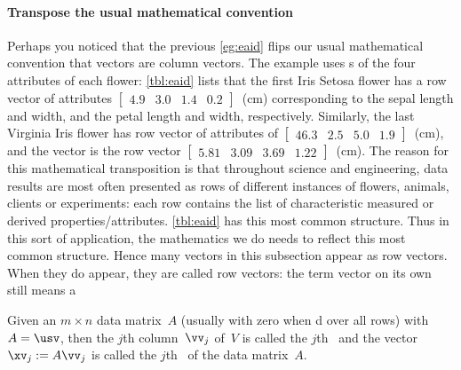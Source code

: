\paragraph{Transpose the usual mathematical convention}
Perhaps you noticed that the previous \cref{eg:eaid} flips our usual mathematical convention that vectors are column vectors.
The example uses s of the four attributes of each flower: 
\cref{tbl:eaid} lists that the first Iris Setosa flower has a row vector of attributes \(\begin{bmatrix} 4.9&3.0&1.4&0.2 \end{bmatrix}\)~(cm) corresponding to the sepal length and width, and the petal length and width, respectively.
Similarly, the last Virginia Iris flower has row vector of attributes of \(\begin{bmatrix} 46.3&2.5&5.0&1.9 \end{bmatrix}\)~(cm), and the  vector is the row vector \(\begin{bmatrix} 5.81&3.09&3.69&1.22 \end{bmatrix}\)~(cm).
The reason for this mathematical transposition is that throughout science and engineering, data results are most often presented as rows of different instances of flowers, animals, clients or experiments: each row contains the list of characteristic measured or derived properties\slash attributes.
\cref{tbl:eaid} has this most common structure.
Thus in this sort of application, the mathematics we do needs to reflect this most common structure.
Hence many vectors in this subsection appear as row vectors.
When they do appear, they are called row vectors: the term vector on its own still means a 




\begin{definition} \label{def:pc}
Given an \(m\times n\) data matrix~\(A\) (usually with zero  when d over all rows) with  \svd\ \(A=\usv\), then the \(j\)th column~\(\vv_j\) of~\(V\) is called the \(j\)th~ and the vector \(\xv_j:=A\vv_j\) is called the \(j\)th~ of the data matrix~\(A\).
\end{definition}



